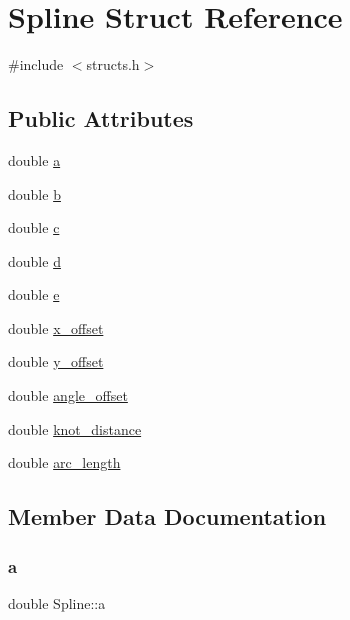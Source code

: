 \hypertarget{structSpline}{}\section{Spline Struct Reference}
\label{structSpline}


{\ttfamily \#include $<$structs.\+h$>$}

\subsection*{Public Attributes}
\begin{DoxyCompactItemize}
\item 
double \mbox{\hyperlink{structSpline_aa08b4a0ee2c362473cd2f3ba8200ec52}{a}}
\item 
double \mbox{\hyperlink{structSpline_a92f4fc3ca7ee41e408cf71e97c8dee55}{b}}
\item 
double \mbox{\hyperlink{structSpline_ab7c6f4180c1ab1b107b5f53da323ee6f}{c}}
\item 
double \mbox{\hyperlink{structSpline_a46dd289182b23535453bed843dfceb4e}{d}}
\item 
double \mbox{\hyperlink{structSpline_a52eb61e02c3b84aee68a85fe1999145c}{e}}
\item 
double \mbox{\hyperlink{structSpline_a8ba4a94300befec100072f52b3d94212}{x\+\_\+offset}}
\item 
double \mbox{\hyperlink{structSpline_a100540b91150c4fc64983c3ac9107beb}{y\+\_\+offset}}
\item 
double \mbox{\hyperlink{structSpline_a90b88d9563fc363f9c852c1b1036ad61}{angle\+\_\+offset}}
\item 
double \mbox{\hyperlink{structSpline_a3b05595ec975c153ab36c3d064cc8266}{knot\+\_\+distance}}
\item 
double \mbox{\hyperlink{structSpline_a5ab5c330b2fe7f611f8cb56db958ee43}{arc\+\_\+length}}
\end{DoxyCompactItemize}


\subsection{Member Data Documentation}
\mbox{\label{structSpline_aa08b4a0ee2c362473cd2f3ba8200ec52}} 
\subsubsection{\texorpdfstring{a}{a}}
{\footnotesize\ttfamily double Spline\+::a}

